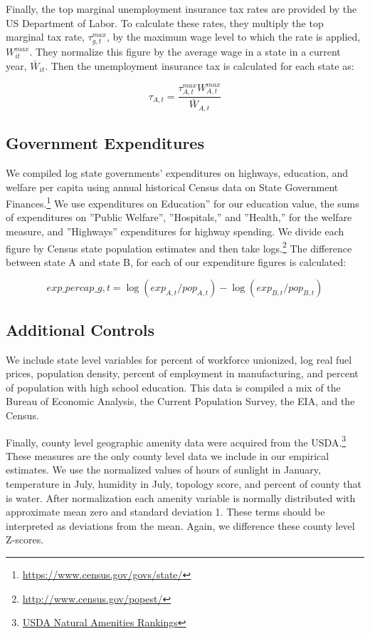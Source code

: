 \documentclass[12pt,a4paper]{article}
\begin{document}
Finally, the top marginal unemployment insurance tax rates are provided by the US Department of Labor. To calculate these rates, they multiply the top marginal tax rate, $\tau_{g,t}^{max}$, by the maximum wage level to which the rate is applied, $W_{it}^{max}$. They normalize this figure by the average wage in a state in a current year, $\bar W_{it}$. Then the unemployment insurance tax is calculated for each state as: 

\begin{equation} \tau_{A,t} = \frac{\tau_{A,t}^{max}W_{A,t}^{max}}{\bar W_{A,t}}\end{equation}

\subsection{Government Expenditures}

We compiled log state governments’ expenditures on highways, education, and welfare per capita using annual historical Census data on State Government Finances.\footnote{\url{https://www.census.gov/govs/state/}} We use expenditures on Education” for our education value, the sums of expenditures on ”Public Welfare”, ”Hospitals,” and ”Health,” for the welfare measure, and ”Highways” expenditures for highway spending.  We divide each figure by Census state population estimates and then take logs.\footnote{\url{http://www.census.gov/popest/}} The difference between state A and state B, for each of our expenditure figures is calculated:

\begin{equation} exp\_percap\_{g,t} = \log(exp_{A,t}/pop_{A,t}) - \log(exp_{B,t}/pop_{B,t}) \end{equation}

\subsection{Additional Controls}

We include state level variables for percent of workforce unionized, log real fuel prices, population density, percent of employment in manufacturing, and percent of population with high school education. This data is compiled a mix of the Bureau of Economic Analysis, the Current Population Survey, the EIA, and the Census.

Finally, county level geographic amenity data were acquired from the USDA.\footnote{\href{http://www.ers.usda.gov/data-products/natural-amenities-scale.aspx}{USDA Natural Amenities Rankings}} These measures are the only county level data we include in our empirical estimates. We use the normalized values of hours of sunlight in January, temperature in July, humidity in July, topology score, and percent of county that is water. After normalization each amenity variable is normally distributed with approximate mean zero and standard deviation 1. These terms should be interpreted  as deviations from the mean. Again, we difference these county level Z-scores.
\end{document}
